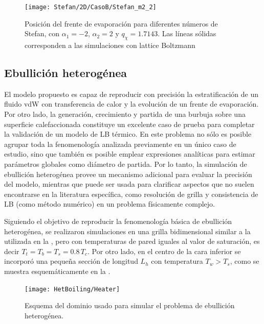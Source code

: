 \begin{figure}[ht]
	\centering
	\texttt{[image: Stefan/2D/CasoB/Stefan\_m2\_2]}
	\caption{Posici\'on del frente de evaporaci\'on para diferentes n\'umeros de Stefan, con $\alpha_1 = -2$, $\alpha_2=2$ y $q_{\chi} = 1.7143$. Las l\'ineas s\'olidas corresponden a las simulaciones con lattice Boltzmann}
	\label{fig:Stefan_m2_2}
\end{figure}










\subsection{Ebullici\'on heterog\'enea}
\label{sec:hetb_2d}

El modelo propuesto es capaz de reproducir con precisi\'on la estratificaci\'on de un fluido vdW con transferencia de calor y la evoluci\'on de un frente de evaporaci\'on. Por otro lado, la generaci\'on, crecimiento y partida de una burbuja sobre  una superficie calefaccionada constituye un excelente caso de prueba para completar la validaci\'on de un modelo de LB t\'ermico. En este problema no s\'olo es posible agrupar toda la fenomenolog\'ia analizada previamente en un \'unico caso de estudio, sino que tambi\'en es posible emplear expresiones anal\'iticas para estimar par\'ametros globales como di\'ametro de partida. Por lo tanto, la simulaci\'on de ebullici\'on heterog\'enea provee un mecanismo adicional para evaluar la precisi\'on del modelo, mientras que puede ser usada para clarificar aspectos que no suelen encontrarse en la literatura espec\'ifica, como resoluci\'on de grilla y consistencia de LB (como m\'etodo num\'erico) en un problema f\'isicamente complejo.

Siguiendo el objetivo de reproducir la fenomenolog\'ia b\'asica de ebullici\'on heterog\'enea, se realizaron simulaciones en una grilla bidimensional similar a la utilizada en la , pero con temperaturas de pared iguales al valor de saturaci\'on, es decir $T_t = T_b = T_s = 0.8 \, T_c$.  Por otro lado, en el centro de la cara inferior se incorpor\'o una peque\~na secci\'on de longitud $L_h$ con temperatura $T_w > T_s$, como se muestra esquem\'aticamente en la . 

\begin{figure}[ht]
	\centering
	\texttt{[image: HetBoiling/Heater]}
	\caption{Esquema del dominio usado para simular el problema de ebullici\'on heterog\'enea.}
	\label{fig:hetb_esquema}
\end{figure}

